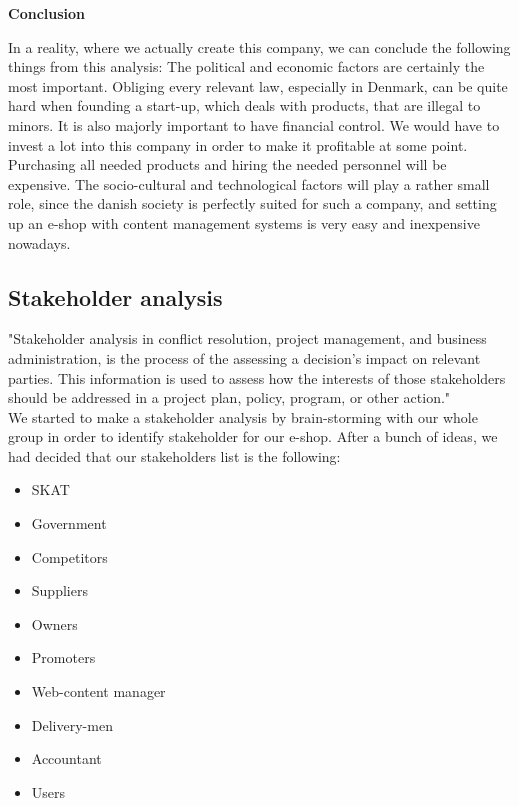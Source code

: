 \documentclass[12p]{article}
\begin{document}
\textbf{Conclusion}

In a reality, where we actually create this company, we can conclude the following things from this analysis: The political and economic factors are certainly the most important. Obliging every relevant law, especially in Denmark, can be quite hard when founding a start-up, which deals with products, that are illegal to minors. It is also majorly important to have financial control. We would have to invest a lot into this company in order to make it profitable at some point. Purchasing all needed products and hiring the needed personnel will be expensive. The socio-cultural and technological factors will play a rather small role, since the danish society is perfectly suited for such a company, and setting up an e-shop with content management systems is very easy and inexpensive nowadays.

\newpage


\subsection{Stakeholder analysis} \label{Stakeholder_Analysis}
"Stakeholder analysis in conflict resolution, project management, and business administration, is the process of the assessing a decision's impact on relevant parties. This information is used to assess how the interests of those stakeholders should be addressed in a project plan, policy, program, or other action." \cite{StakeholderAnalysis}
\\
We started to make a stakeholder analysis by brain-storming with our whole group in order to identify stakeholder for our e-shop. After a bunch of ideas, we had decided that our stakeholders list is the following:
\begin{itemize}
\item SKAT
\item Government
\item Competitors
\item Suppliers
\item Owners
\item Promoters
\item Web-content manager
\item Delivery-men
\item Accountant
\item Users
\end{itemize}
\end{document}
